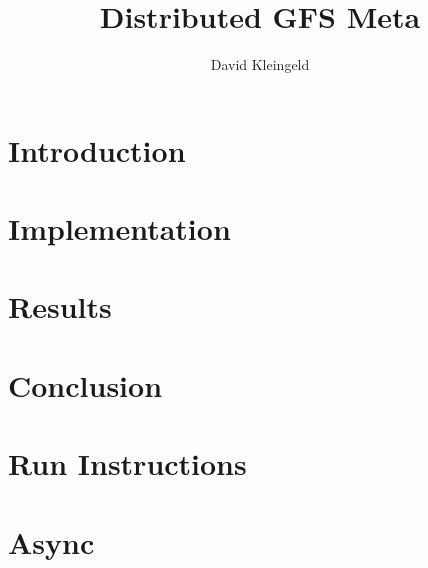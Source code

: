 \documentclass[lang=en, hanging-titles=true]{skrapport}
\title{Distributed GFS Meta}
\author[opensource@davidsk.dev]{David Kleingeld}
\begin{document}
\maketitle
\tableofcontents

\section{Introduction} 
\label{sec:intro}

\section{Implementation} 
\label{sec:impl}

\section{Results} 
\label{sec:res}

\section{Conclusion} 
\label{sec:conc}


\clearpage
\appendix
\section{Run Instructions} 
\label{sec:deploy}

\section{Async} 
\label{sec:async}

\printbibliography
\end{document}
